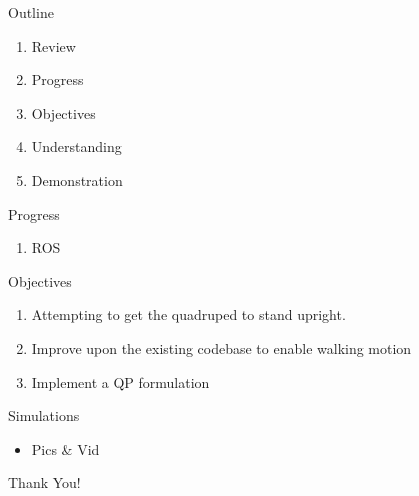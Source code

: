 \documentclass{beamer}
\begin{document}
\begin{frame}\titlepage\end{frame}\normalfont


\begin{frame}{Outline}
	\begin{enumerate}
            \item Review
		\item Progress
            \item Objectives
            \item Understanding
            \item Demonstration
	\end{enumerate}
\end{frame}\normalfont
\begin{frame}{Progress}
        \begin{enumerate}
            \item ROS
        \end{enumerate}
\end{frame}\normalfont
\begin{frame}{Objectives}
        \begin{enumerate}
            \item{Attempting to get the quadruped to stand upright.}
            \item{Improve upon the existing codebase to enable walking motion}
            \item{Implement a QP formulation}
        \end{enumerate}
\end{frame}\normalfont

\begin{frame}{Simulations}
\begin{itemize}
    \item Pics \& Vid
\end{itemize}
\end{frame}

\begin{frame}
	\LARGE{Thank You!}
\end{frame}\normalfont
\end{document}
